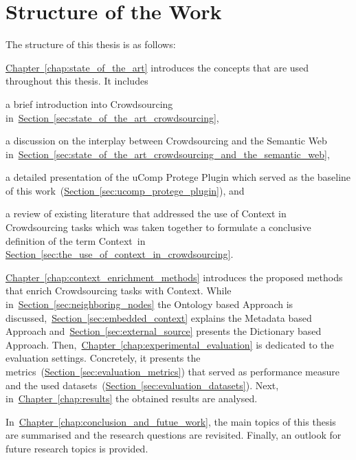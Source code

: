 \section{Structure of the Work}
The structure of this thesis is as follows:

\hyperref[chap:state_of_the_art]{Chapter~\ref*{chap:state_of_the_art}} introduces the concepts that are used throughout this thesis. It includes
\begin{inparaenum}[i)]
		\item a brief introduction into Crowdsourcing in~\hyperref[sec:state_of_the_art_crowdsourcing]{Section~\ref*{sec:state_of_the_art_crowdsourcing}},
		\item a discussion on the interplay between Crowdsourcing and the Semantic Web in~\hyperref[sec:state_of_the_art_crowdsourcing_and_the_semantic_web]{Section~\ref*{sec:state_of_the_art_crowdsourcing_and_the_semantic_web}},
		\item a detailed presentation of the uComp Protege Plugin which served as the baseline of this work~(\hyperref[sec:ucomp_protege_plugin]{Section~\ref*{sec:ucomp_protege_plugin}}), and 
		\item a review of existing literature that addressed the use of Context in Crowdsourcing tasks which was taken together to formulate a conclusive definition of the term \guillemotright Context\guillemotleft~in \hyperref[sec:the_use_of_context_in_crowdsourcing]{Section~\ref*{sec:the_use_of_context_in_crowdsourcing}}.
\end{inparaenum}

\hyperref[chap:context_enrichment_methods]{Chapter~\ref*{chap:context_enrichment_methods}} introduces the proposed methods that enrich Crowdsourcing tasks with Context. While in~\hyperref[sec:neighboring_nodes]{Section~\ref*{sec:neighboring_nodes}} the Ontology based Approach is discussed,~\hyperref[sec:embedded_context]{Section~\ref*{sec:embedded_context}} explains the Metadata based Approach and~\hyperref[sec:external_source]{Section~\ref*{sec:external_source}} presents the Dictionary based Approach. Then,~\hyperref[chap:experimental_evaluation]{Chapter~\ref*{chap:experimental_evaluation}} is dedicated to the evaluation settings. Concretely, it presents the metrics~(\hyperref[sec:evaluation_metrics]{Section~\ref*{sec:evaluation_metrics}}) that served as performance measure and the used
datasets~(\hyperref[sec:evaluation_datasets]{Section~\ref*{sec:evaluation_datasets}}).
Next, in~\hyperref[chap:results]{Chapter~\ref*{chap:results}} the obtained results are analysed.

In~\hyperref[chap:conclusion_and_futue_work]{Chapter~\ref*{chap:conclusion_and_futue_work}}, the main topics of this thesis are summarised and the research questions are revisited. Finally, an outlook for future research topics is provided.
